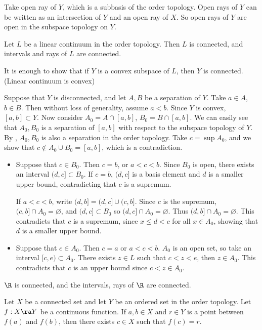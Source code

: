 \note{\(\subset\)} Take open ray of \(Y\), which is a subbasis of the order topology. Open rays of \(Y\) can be written as an intersection of \(Y\) and an open ray of \(X\). So open rays of \(Y\) are open in the subspace topology on \(Y\).

\pagebreak

 Let \(L\) be a linear continuum in the order topology. Then \(L\) is connected, and intervals and rays of \(L\) are connected.

\pf It is enough to show that if \(Y\) is a convex subspace of \(L\), then \(Y\) is connected. (Linear continuum is convex)

Suppose that \(Y\) is disconnected, and let \(A, B\) be a separation of \(Y\). Take \(a \in A\), \(b \in B\). Then without loss of generality, assume \(a < b\). Since \(Y\) is convex, \([a, b] \subset Y\). Now consider \(A_0 = A \cap [a, b]\), \(B_0 = B \cap [a, b]\). We can easily see that \(A_0, B_0\) is a separation of \([a, b]\) with respect to the subspace topology of \(Y\). By , \(A_0, B_0\) is also a separation in the order topology. Take \(c = \sup A_0\), and we show that \(c \notin A_0 \cup B_0 = [a, b]\), which is a contradiction.
\begin{itemize}
    \item Suppose that \(c \in B_0\). Then \(c = b\), or \(a < c < b\). Since \(B_0\) is open, there exists an interval \((d, c] \subset B_0\). If \(c = b\), \((d, c]\) is a basis element and \(d\) is a smaller upper bound, contradicting that \(c\) is a supremum.

          If \(a < c < b\), write \((d, b] = (d, c] \cup (c, b]\). Since \(c\) is the supremum, \((c, b] \cap A_0 = \varnothing\), and \((d, c] \subset B_0\) so \((d, c] \cap A_0 = \varnothing\). Thus \((d, b] \cap A_0 = \varnothing\). This contradicts that \(c\) is a supremum, since \(x \leq d < c\) for all \(x \in A_0\), showing that \(d\) is a smaller upper bound.
    \item Suppose that \(c \in A_0\). Then \(c = a\) or \(a < c < b\). \(A_0\) is an open set, so take an interval \([c, e) \subset A_0\). There exists \(z \in L\) such that \(c < z < e\), then \(z \in A_0\). This contradicts that \(c\) is an upper bound since \(c < z \in A_0\).
\end{itemize}

 \(\R\) is connected, and the intervals, rays of \(\R\) are connected.

  Let \(X\) be a connected set and let \(Y\) be an ordered set in the order topology. Let \(f : X \ra Y\) be a continuous function. If \(a, b \in X\) and \(r \in Y\) is a point between \(f(a)\) and \(f(b)\), then there exists \(c \in X\) such that \(f(c) = r\).

